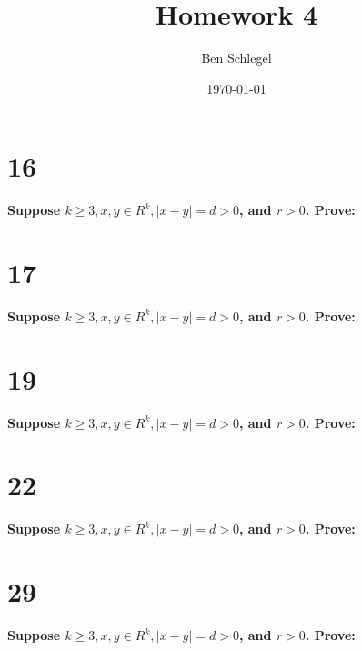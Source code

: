 \documentclass{article}
\author{Ben Schlegel
}
\title{Homework 4}
\date{\today}
\begin{document}
\maketitle

\section* {16} 
\noindent \textbf{Suppose $k \ge 3, x, y \in R^k,|x-y| = d > 0 $, and $r > 0$. Prove:}

\section* {17} 
\noindent \textbf{Suppose $k \ge 3, x, y \in R^k,|x-y| = d > 0 $, and $r > 0$. Prove:}

\section* {19} 
\noindent \textbf{Suppose $k \ge 3, x, y \in R^k,|x-y| = d > 0 $, and $r > 0$. Prove:}

\section* {22} 
\noindent \textbf{Suppose $k \ge 3, x, y \in R^k,|x-y| = d > 0 $, and $r > 0$. Prove:}

\section* {29} 
\noindent \textbf{Suppose $k \ge 3, x, y \in R^k,|x-y| = d > 0 $, and $r > 0$. Prove:}
\end{document}
